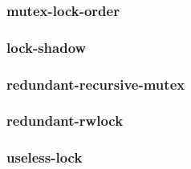 \subsubsection{mutex-lock-order}
\subsubsection{lock-shadow}
\subsubsection{redundant-recursive-mutex}
\subsubsection{redundant-rwlock}
\subsubsection{useless-lock}
